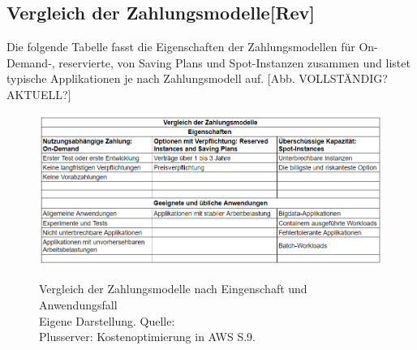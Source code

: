 \subsection*{Vergleich der Zahlungsmodelle[Rev]}
Die folgende Tabelle fasst die Eigenschaften der Zahlungsmodellen für On-Demand-, reservierte, von Saving Plans und Spot-Instanzen zusammen und listet typische Applikationen je nach Zahlungsmodell auf.
[Abb. VOLLSTÄNDIG?AKTUELL?]
\begin{figure}[h!]
    \centering
    \includegraphics[scale=0.63]{sources/Vergleich_der_Zahlungsmodelle}\label{fig:Vergleich_der_Zahlungsmodelle}\\
    \caption[Vergleich der Zahlungsmodelle]{}
    \label{fig:Vergleich_der_Zahlungsmodelle}  Vergleich der Zahlungsmodelle nach Eingenschaft und Anwendungsfall\\
Eigene Darstellung. Quelle: {\cite{AMZ02, AMZ07, AMZ11, AMZ19,SPOT1}}\\
{Plusserver: Kostenoptimierung in AWS S.9.\cite{PS1}}
  \end{figure}
%

\newpage
